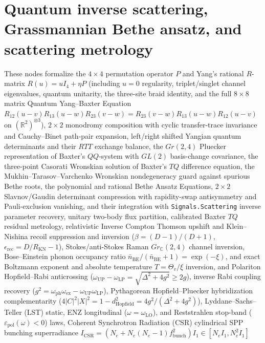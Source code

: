 
\section{Quantum inverse scattering, Grassmannian Bethe ansatz, and scattering metrology}

These nodes formalize the $4\times 4$ permutation operator $P$ and Yang's
rational $R$-matrix $R(u)=uI_4+\eta P$ (including $u=0$ regularity,
triplet/singlet channel eigenvalues, quantum unitarity, the three-site braid
identity, and the full $8\times 8$ matrix Quantum Yang--Baxter Equation
$R_{12}(u-v)R_{13}(u-w)R_{23}(v-w)=R_{23}(v-w)R_{13}(u-w)R_{12}(u-v)$ on
$(\mathbb R^2)^{\otimes 3}$), $2\times 2$ monodromy composition with cyclic transfer-trace
invariance and Cauchy--Binet path-pair expansion, left/right shifted Yangian
quantum determinants and their $RTT$ exchange balance, the $Gr(2,4)$ Pluecker
representation of Baxter's $QQ$-system with $GL(2)$ basis-change covariance,
the three-point Casorati Wronskian solution of Baxter's $TQ$ difference
equation, the Mukhin--Tarasov--Varchenko Wronskian nondegeneracy guard against
spurious Bethe roots, the polynomial and rational Bethe Ansatz Equations,
$2\times 2$ Slavnov/Gaudin determinant compression with rapidity-swap
antisymmetry and Pauli-exclusion vanishing, and their integration with
\texttt{Signals.Scattering} inverse parameter recovery, unitary two-body flux
partition, calibrated Baxter $TQ$ residual metrology, relativistic Inverse
Compton Thomson upshift and Klein--Nishina recoil suppression and inversion
($\beta=(D-1)/(D+1)$, $\epsilon_{\mathrm{rec}}=D/R_{\mathrm{KN}}-1$),
Stokes/anti-Stokes Raman $Gr_{\mathbb C}(2,4)$ channel inversion, Bose--Einstein
phonon occupancy ratio $\bar{n}_{\mathrm{BE}}/(\bar{n}_{\mathrm{BE}}+1)=\exp(-\xi)$,
and exact Boltzmann exponent and absolute temperature $T=\Theta_v/\xi$ inversion,
and Polariton Hopfield--Rabi anticrossing ($\omega_{\mathrm{UP}}-\omega_{\mathrm{LP}}=\sqrt{\Delta^2+4g^2}\ge 2g$),
inverse Rabi coupling recovery ($g^2=\omega_{\mathrm{ph}}\omega_{\mathrm{ex}}-\omega_{\mathrm{UP}}\omega_{\mathrm{LP}}$),
Pythagorean Hopfield--Pluecker hybridization complementarity
($4|C|^2|X|^2=1-d_{\mathrm{Hopfield}}^2=4g^2/(\Delta^2+4g^2)$),
Lyddane--Sachs--Teller (LST) static, ENZ longitudinal ($\omega=\omega_{\mathrm{LO}}$),
and Reststrahlen stop-band ($\varepsilon_{\mathrm{pol}}(\omega)<0$) laws,
Coherent Synchrotron Radiation (CSR) cylindrical SPP bunching superradiance
$I_{\mathrm{CSR}}=(N_e+N_e(N_e-1)f_{\mathrm{bunch}}^2)I_1\in[N_e I_1,N_e^2 I_1]$
